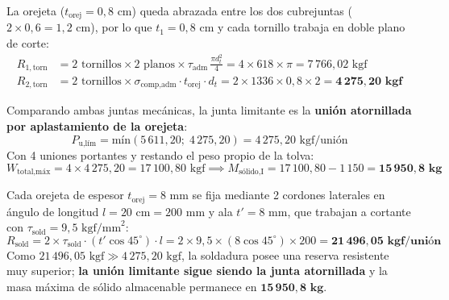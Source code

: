 {
La orejeta ($t_{\text{orej}} = 0{,}8\text{ cm}$) queda abrazada entre los dos cubrejuntas ($2\times 0{,}6 = 1{,}2\text{ cm}$), por lo que $t_1 = 0{,}8\text{ cm}$ y cada tornillo trabaja en doble plano de corte:
\begin{align*}
    R_{1,\text{torn}} &= 2\text{ tornillos} \times 2\text{ planos} \times \tau_{\text{adm}}\,\frac{\pi d_t^2}{4} = 4 \times 618 \times \pi = 7\,766{,}02\text{ kgf} \\
    R_{2,\text{torn}} &= 2\text{ tornillos} \times \sigma_{\text{comp,adm}} \cdot t_{\text{orej}} \cdot d_t = 2 \times 1336 \times 0{,}8 \times 2 = \mathbf{4\,275{,}20\text{ kgf}}
\end{align*}

Comparando ambas juntas mecánicas, la junta limitante es la \textbf{unión atornillada por aplastamiento de la orejeta}:
\begin{equation*}
    P_{\text{u,lím}} = \text{mín}(5\,611{,}20;\; 4\,275{,}20) = 4\,275{,}20\text{ kgf/unión}
\end{equation*}
Con 4 uniones portantes y restando el peso propio de la tolva:
\begin{equation*}
    W_{\text{total,máx}} = 4 \times 4\,275{,}20 = 17\,100{,}80\text{ kgf} \implies M_{\text{sólido,I}} = 17\,100{,}80 - 1\,150 = \mathbf{15\,950{,}8\text{ kg}}
\end{equation*}

Cada orejeta de espesor $t_{\text{orej}} = 8\text{ mm}$ se fija mediante 2 cordones laterales en ángulo de longitud $l = 20\text{ cm} = 200\text{ mm}$ y ala $t' = 8\text{ mm}$, que trabajan a cortante con $\tau_{\text{sold}} = 9{,}5\text{ kgf/mm}^2$:
\begin{equation*}
    R_{\text{sold}} = 2 \times \tau_{\text{sold}} \cdot (t'\cos 45^\circ) \cdot l = 2 \times 9{,}5 \times (8\cos 45^\circ) \times 200 = \mathbf{21\,496{,}05\text{ kgf/unión}}
\end{equation*}
Como $21\,496{,}05\text{ kgf} \gg 4\,275{,}20\text{ kgf}$, la soldadura posee una reserva resistente muy superior; \textbf{la unión limitante sigue siendo la junta atornillada} y la masa máxima de sólido almacenable permanece en $\mathbf{15\,950{,}8\text{ kg}}$.
}

